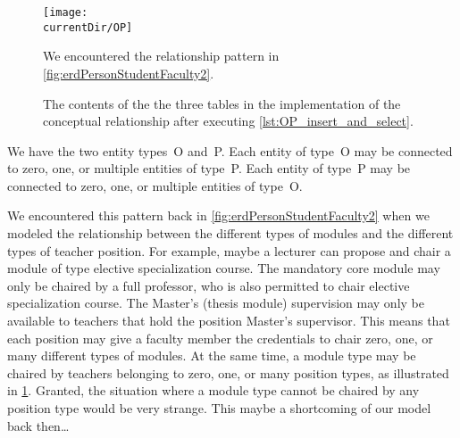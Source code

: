 %
%
\label{sec:rm:op}%
%
\begin{figure}%
\centering%
\texttt{[image: \\currentDir/OP]}%
\caption{We encountered the  relationship pattern in \cref{fig:erdPersonStudentFaculty2}.}%
\label{fig:rm:op}%
\end{figure}%
%
%
%
%
%
%
%
%
\begin{figure}%
\centering%
\floatSep%
%
\floatSep%
%
\floatSep%
%
\floatSep%
\caption{The contents of the the three tables in the implementation of the  conceptual relationship after executing \cref{lst:OP_insert_and_select}.}%
\label{fig:rm:op:tables}%
\end{figure}%
%
%
%
We have the two entity types~O and~P.
Each entity of type~O may be connected to zero, one, or multiple entities of type~P.
Each entity of type~P may be connected to zero, one, or multiple entities of type~O.

We encountered this pattern back in \cref{fig:erdPersonStudentFaculty2} when we modeled the relationship between the different types of modules and the different types of teacher position.
For example, maybe a lecturer can propose and chair a module of type elective specialization course.
The mandatory core module may only be chaired by a full professor, who is also permitted to chair elective specialization course.
The Master's (thesis module) supervision may only be available to teachers that hold the position Master's supervisor.
This means that each position may give a faculty member the credentials to chair zero, one, or many different types of modules.
At the same time, a module type may be chaired by teachers belonging to zero, one, or many position types, as illustrated in \cref{fig:rm:op}.
Granted, the situation where a module type cannot be chaired by any position type would be very strange.
This maybe a shortcoming of our model back then{\dots}

